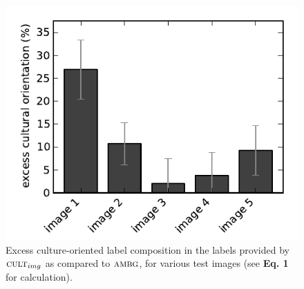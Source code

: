 \documentclass[a4paper]{report}
\begin{document}
\begin{figure}
	\includegraphics{figs/excessCultureVsTreatment-t1.pdf}
	\caption{Excess culture-oriented label composition in the labels provided
		by $\textsc{cult}_{img}$ as compared to $\textsc{ambg}$, for various
		test images (see \textbf{Eq. 1} for calculation).
	}
\end{figure}
\end{document}
